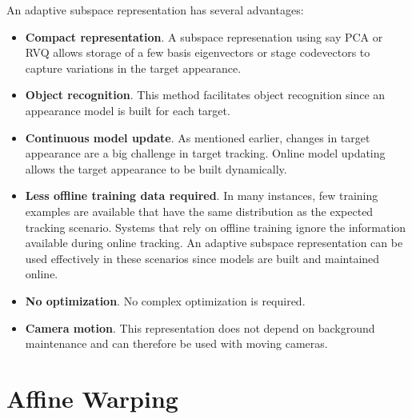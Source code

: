 \documentclass[12pt,letterpaper,doublespaced,ETD]{gt-ece-thesis} %
\begin{document}
\begin{Body}
An adaptive subspace representation has several advantages:

\begin{itemize}
\item \textbf{Compact representation}.  A subspace represenation using say PCA or RVQ allows storage of a few basis eigenvectors or stage codevectors to capture variations in the target appearance.
\item \textbf{Object recognition}.  This method facilitates object recognition since an appearance model is built for each target.
\item \textbf{Continuous model update}.  As mentioned earlier, changes in target appearance are a big challenge in target tracking.  Online model updating allows the target appearance to be built dynamically.
\item \textbf{Less offline training data required}.  In many instances, few training examples are available that have the same distribution as the expected tracking scenario.  Systems that rely on offline training ignore the information available during online tracking.  An adaptive subspace representation can be used effectively in these scenarios since models are built and maintained online.
\item \textbf{No optimization}.  No complex optimization is required.
\item \textbf{Camera motion}.  This representation does not depend on background maintenance and can therefore be used with moving cameras.
\end{itemize}

\newpage
\section{Affine Warping}
%
%



\end{Body}
\end{document}
